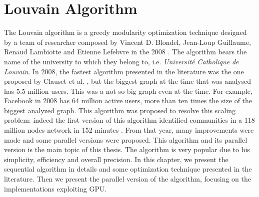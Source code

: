 
\section{Louvain Algorithm}\label{C4}
The Louvain algorithm is a greedy modularity optimization technique designed by a team of researcher composed by Vincent D. Blondel, Jean-Loup Guillaume, Renaud Lambiotte and Etienne Lefebvre in the 2008 \cite{Blondel_2008}. The algorithm bears the name of the university to which they belong to, i.e. \textit{Université Catholique de Louvain}.
In 2008, the fastest algorithm presented in the literature was the one proposed by Clauset et al. \cite{Clauset_2004}, but the biggest graph at the time that was analysed has 5.5 million users. This was a not so big graph even at the time. For example, Facebook in 2008 has 64 million active users, more than ten times the size of the biggest analyzed graph. This algorithm was proposed to resolve this scaling problem:  indeed the first version of this algorithm identified communities in a 118 million nodes network in 152 minutes \cite{Blondel_2008}. From that year, many improvements were made and some parallel versions were proposed. 
This algorithm and its parallel version is the main topic of this thesis. The algorithm is very popular due to his simplicity, efficiency and overall precision.
In this chapter, we present the sequential algorithm in details and some optimization technique presented in the literature.
Then we present the parallel version of the algorithm, focusing on the implementations exploiting GPU.
